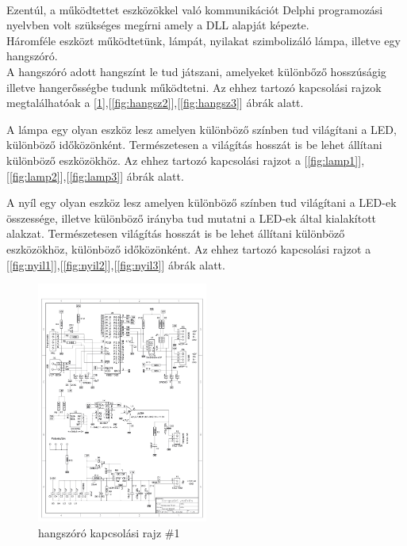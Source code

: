 \documentclass[tocnopagenum]{thesis-ekf}
\theoremstyle{definition}
\theoremstyle{remark}
\begin{document}
	\\
	Ezentúl, a működtettet eszközökkel való kommunikációt Delphi programozási nyelvben volt szükséges megírni amely a DLL alapját képezte. 
	\\
	Háromféle eszközt működtetünk, lámpát, nyilakat szimbolizáló lámpa, illetve egy hangszóró.
	\\  
	A hangszóró adott hangszínt le tud játszani, amelyeket különbőző hosszúságig illetve hangerősségbe tudunk működtetni.
	Az ehhez tartozó kapcsolási rajzok megtalálhatóak a [\ref{fig:hangsz1}],[\ref{fig:hangsz2}],[\ref{fig:hangsz3}] ábrák alatt.
	\par
	A lámpa egy olyan eszköz lesz amelyen különböző színben tud világítani a LED, különböző időközönként. Természetesen a világítás hosszát is be lehet állítani különböző eszközökhöz.
	Az ehhez tartozó kapcsolási rajzot a [\ref{fig:lamp1}],[\ref{fig:lamp2}],[\ref{fig:lamp3}] ábrák alatt.
	\par
	A nyíl egy olyan eszköz lesz amelyen különböző színben tud világítani a LED-ek összessége, illetve különböző irányba tud mutatni a LED-ek által kialakított alakzat.  Természetesen  világítás hosszát is be lehet állítani különböző eszközökhöz, különböző időközönként.
Az ehhez tartozó kapcsolási rajzot a [\ref{fig:nyil1}],[\ref{fig:nyil2}],[\ref{fig:nyil3}] ábrák alatt.\medskip
\\
	\begin{figure}[h!]
	
	\centering
	\includegraphics[page=1,width=0.5\textwidth]{SLH}
	\caption{hangszóró kapcsolási rajz \#1}
	\label{fig:hangsz1}
	
	\end{figure}
\end{document}
